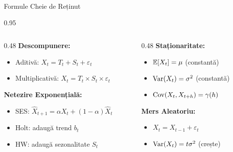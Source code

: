 \documentclass[9pt, aspectratio=169, t]{beamer}
\begin{document}
\begin{frame}{Formule Cheie de Reținut}
    \begin{cminipage}{0.95\textwidth}
    \begin{columns}[T]
        \begin{column}{0.48\textwidth}
            \textbf{Descompunere:}
            \begin{itemize}\setlength{\itemsep}{0pt}
                \item Aditivă: $X_t = T_t + S_t + \varepsilon_t$
                \item Multiplicativă: $X_t = T_t \times S_t \times \varepsilon_t$
            \end{itemize}

            \vspace{0.3cm}

            \textbf{Netezire Exponențială:}
            \begin{itemize}\setlength{\itemsep}{0pt}
                \item SES: $\hat{X}_{t+1} = \alpha X_t + (1-\alpha)\hat{X}_t$
                \item Holt: adaugă trend $b_t$
                \item HW: adaugă sezonalitate $S_t$
            \end{itemize}
        \end{column}
        \begin{column}{0.48\textwidth}
            \textbf{Staționaritate:}
            \begin{itemize}\setlength{\itemsep}{0pt}
                \item $\mathbb{E}[X_t] = \mu$ (constantă)
                \item $\text{Var}(X_t) = \sigma^2$ (constantă)
                \item $\text{Cov}(X_t, X_{t+h}) = \gamma(h)$
            \end{itemize}

            \vspace{0.3cm}

            \textbf{Mers Aleatoriu:}
            \begin{itemize}\setlength{\itemsep}{0pt}
                \item $X_t = X_{t-1} + \varepsilon_t$
                \item $\text{Var}(X_t) = t\sigma^2$ (crește)
            \end{itemize}
        \end{column}
    \end{columns}
    \end{cminipage}
\end{frame}
\end{document}
